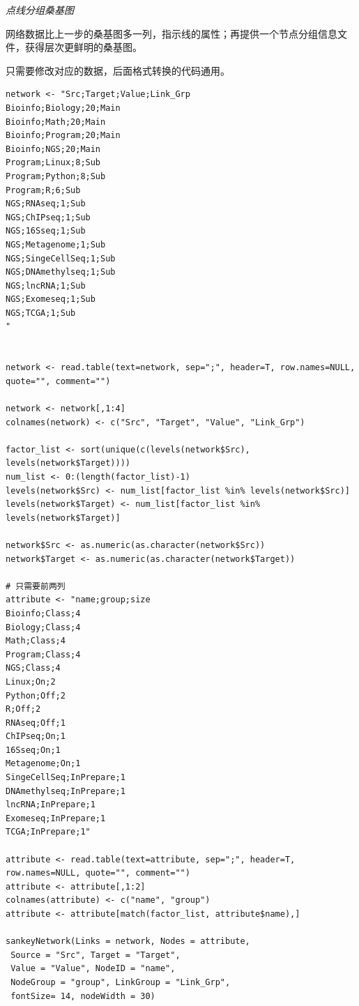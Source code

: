 \documentclass[]{article}
\numberwithin{figure}{section}
\numberwithin{table}{section}
\theoremstyle{definition}
\theoremstyle{definition}
\theoremstyle{definition}
\theoremstyle{remark}
\begin{document}
\emph{点线分组桑基图}

网络数据比上一步的桑基图多一列，指示线的属性；再提供一个节点分组信息文件，获得层次更鲜明的桑基图。

只需要修改对应的数据，后面格式转换的代码通用。

\begin{verbatim}
network <- "Src;Target;Value;Link_Grp
Bioinfo;Biology;20;Main
Bioinfo;Math;20;Main
Bioinfo;Program;20;Main
Bioinfo;NGS;20;Main
Program;Linux;8;Sub
Program;Python;8;Sub
Program;R;6;Sub
NGS;RNAseq;1;Sub
NGS;ChIPseq;1;Sub
NGS;16Sseq;1;Sub
NGS;Metagenome;1;Sub
NGS;SingeCellSeq;1;Sub
NGS;DNAmethylseq;1;Sub
NGS;lncRNA;1;Sub
NGS;Exomeseq;1;Sub
NGS;TCGA;1;Sub
"


network <- read.table(text=network, sep=";", header=T, row.names=NULL, quote="", comment="")

network <- network[,1:4]
colnames(network) <- c("Src", "Target", "Value", "Link_Grp")

factor_list <- sort(unique(c(levels(network$Src), levels(network$Target))))
num_list <- 0:(length(factor_list)-1)
levels(network$Src) <- num_list[factor_list %in% levels(network$Src)]
levels(network$Target) <- num_list[factor_list %in% levels(network$Target)]

network$Src <- as.numeric(as.character(network$Src))
network$Target <- as.numeric(as.character(network$Target))

# 只需要前两列
attribute <- "name;group;size
Bioinfo;Class;4
Biology;Class;4
Math;Class;4
Program;Class;4
NGS;Class;4
Linux;On;2
Python;Off;2
R;Off;2
RNAseq;Off;1
ChIPseq;On;1
16Sseq;On;1
Metagenome;On;1
SingeCellSeq;InPrepare;1
DNAmethylseq;InPrepare;1
lncRNA;InPrepare;1
Exomeseq;InPrepare;1
TCGA;InPrepare;1"

attribute <- read.table(text=attribute, sep=";", header=T, row.names=NULL, quote="", comment="")
attribute <- attribute[,1:2]
colnames(attribute) <- c("name", "group")
attribute <- attribute[match(factor_list, attribute$name),]

sankeyNetwork(Links = network, Nodes = attribute,
 Source = "Src", Target = "Target",
 Value = "Value", NodeID = "name",
 NodeGroup = "group", LinkGroup = "Link_Grp",
 fontSize= 14, nodeWidth = 30)
\end{verbatim}
\end{document}
